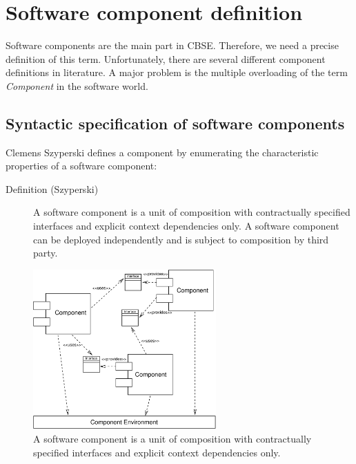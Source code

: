 \section{Software component definition}

Software components are the main part in CBSE. Therefore, we need a precise 
definition of this term.
Unfortunately, there are several different component definitions in 
literature.
A major problem is the multiple overloading of the term {\it Component} in the 
software world.


\subsection{Syntactic specification of software components}

Clemens Szyperski \cite{Szyperski02} defines a component by enumerating the 
characteristic properties of a software component:
\begin{description} 
\item [Definition (Szyperski)] A software component is a unit of composition 
with contractually specified interfaces and explicit context dependencies only.
A software component can be deployed independently and is subject to composition
by third party.
\end{description}

\begin{figure}[htbp]
    \begin{center}
        \includegraphics [width=7cm,angle=0] {figures/Environment}
        \caption{ A software component is a unit of composition 
	with contractually specified interfaces and explicit context 
	dependencies only.}
        \label{ComponentDef}
    \end{center}
\end{figure}

